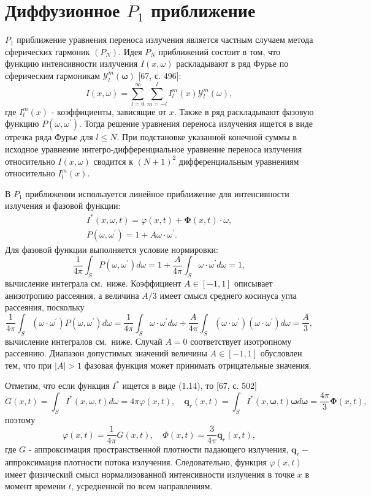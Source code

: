 \section{Диффузионное $P_{1}$ приближение}\label{sec:ch1/sec2}
$P_{1}$ приближение уравнения переноса излучения является частным случаем метода сферических гармоник $\left(P_{N}\right)$. Идея $P_{N}$ приближений состоит в том, что функцию интенсивности излучения $I(x, \omega)$ раскладывают в ряд Фурье по сферическим гармоникам $\mathcal{Y}_{l}^{m}(\boldsymbol{\omega})$ [67, с. 496]:
\[
    I(x, \omega)=\sum_{l=0}^{\infty} \sum_{m=-l}^{l} I_{l}^{m}(x) \mathcal{Y}_{l}^{m}(\omega),
\]
где $I_{l}^{m}(x)$ - коэффициенты, зависящие от $x$.
Также в ряд раскладывают фазовую функцию $P\left(\omega, \omega^{\prime}\right)$.
Тогда решение уравнения переноса излучения ищется в виде отрезка ряда Фурье для $l \leqslant N$.
При подстановке указанной конечной суммы в исходное уравнение интегро-дифференциальное уравнение
переноса излучения относительно $I(x, \omega)$ сводится к $(N+1)^{2}$ дифференциальным уравнениям
относительно $I_{l}^{m}(x)$.


В $P_{1}$ приближении используется линейное приближение для интенсивности излучения и фазовой функции:
\[
    \begin{gathered}
        I^{*}(x, \omega, t)=\varphi(x, t)+\boldsymbol{\Phi}(x, t) \cdot \omega, \\
        P\left(\omega, \omega^{\prime}\right)=1+A \omega \cdot \omega^{\prime}.
    \end{gathered}
\]
Для фазовой функции выполняется условие нормировки:
\[
    \frac{1}{4 \pi} \int_{S} P\left(\omega, \omega^{\prime}\right) d \omega=1+\frac{A}{4 \pi}
    \int_{S} \omega \cdot \omega^{\prime} d \omega=1,
\]
вычисление интеграла см.\ ниже.
Коэффициент $A \in[-1,1]$ описывает анизотропию рассеяния,
а величина $A / 3$ имеет смысл среднего косинуса угла рассеяния, поскольку
\[
    \frac{1}{4 \pi} \int_{S}\left(\omega \cdot \omega^{\prime}\right)
    P\left(\omega, \omega^{\prime}\right) d \omega=\frac{1}{4 \pi}
    \int_{S} \omega \cdot \omega^{\prime} d \omega+\frac{A}{4 \pi}
    \int_{S}\left(\omega \cdot \omega^{\prime}\right)\left(\omega \cdot \omega^{\prime}\right) d \omega=\frac{A}{3},
\]
вычисление интегралов см.\ ниже.
Случай $A=0$ соответствует изотропному рассеянию.
Диапазон допустимых значений величины $A \in[-1,1]$ обусловлен тем, что при $|A|>1$
фазовая функция может принимать отрицательные значения.

Отметим, что если функция $I^{*}$ ищется в виде (1.14), то [67, с. 502]
\[
    G(x, t)=\int_{S} I^{*}(x, \omega, t) d \omega=4 \pi \varphi(x, t),
    \quad \mathbf{q}_{r}(x, t)=\int_{S} I^{*}(x, \boldsymbol{\omega}, t)
    \boldsymbol{\omega} d \boldsymbol{\omega}=\frac{4 \pi}{3} \boldsymbol{\Phi}(x, t),
\]
поэтому
\[
    \varphi(x, t)=\frac{1}{4 \pi} G(x, t), \quad \Phi(x, t)=\frac{3}{4 \pi} \mathbf{q}_{r}(x, t),
\]
где $G$ - аппроксимация пространственной плотности падающего излучения,
$\mathbf{q}_{r}-$ аппроксимация плотности потока излучения.
Следовательно, функция $\varphi(x, t)$ имеет физический смысл нормализованной интенсивности излучения в
точке $x$ в момент времени $t$, усредненной по всем направлениям.

